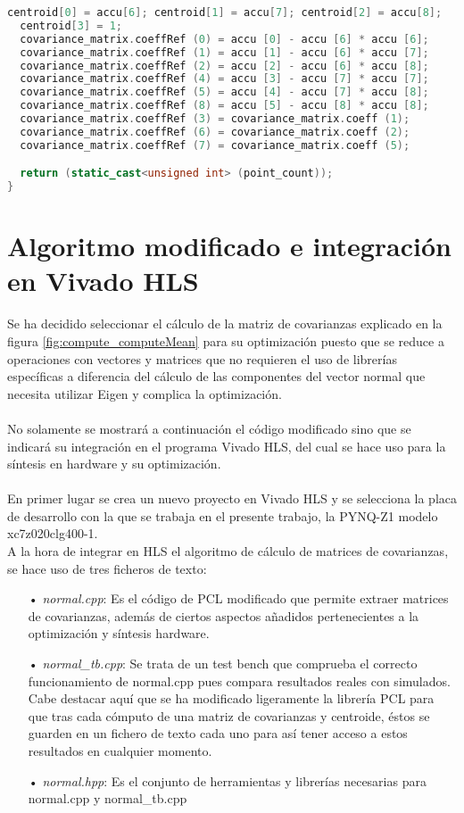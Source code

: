  \begin{lstlisting}[language=C++,breaklines]
  centroid[0] = accu[6]; centroid[1] = accu[7]; centroid[2] = accu[8];
  centroid[3] = 1;
  covariance_matrix.coeffRef (0) = accu [0] - accu [6] * accu [6];
  covariance_matrix.coeffRef (1) = accu [1] - accu [6] * accu [7];
  covariance_matrix.coeffRef (2) = accu [2] - accu [6] * accu [8];
  covariance_matrix.coeffRef (4) = accu [3] - accu [7] * accu [7];
  covariance_matrix.coeffRef (5) = accu [4] - accu [7] * accu [8];
  covariance_matrix.coeffRef (8) = accu [5] - accu [8] * accu [8];
  covariance_matrix.coeffRef (3) = covariance_matrix.coeff (1);
  covariance_matrix.coeffRef (6) = covariance_matrix.coeff (2);
  covariance_matrix.coeffRef (7) = covariance_matrix.coeff (5);

  return (static_cast<unsigned int> (point_count));
}
\end{lstlisting}



\section{Algoritmo modificado e integración en Vivado HLS}
Se ha decidido seleccionar el cálculo de la matriz de covarianzas explicado en la figura \ref{fig:compute_computeMean} para su optimización puesto que se reduce a operaciones con vectores y matrices que no requieren el uso de librerías específicas a diferencia del cálculo de las componentes del vector normal que necesita utilizar Eigen y complica la optimización.
\\
\\
No solamente se mostrará a continuación el código modificado sino que se indicará su integración en el programa Vivado HLS, del cual se hace uso para la síntesis en hardware y su optimización.
\\
\\
En primer lugar se crea un nuevo proyecto en Vivado HLS y se selecciona la placa de desarrollo con la que se trabaja en el presente trabajo, la PYNQ-Z1 modelo xc7z020clg400-1.
\\
A la hora de integrar en HLS el algoritmo de cálculo de matrices de covarianzas, se hace uso de tres ficheros de texto:

\begin{itemize}
\item[•] \textit{normal.cpp}: Es el código de PCL modificado que permite extraer matrices de covarianzas, además de ciertos aspectos añadidos pertenecientes a la optimización y síntesis hardware.
\item[•] \textit{normal\_tb.cpp}: Se trata de un test bench que comprueba el correcto funcionamiento de normal.cpp pues compara resultados reales con simulados. Cabe destacar aquí que se ha modificado ligeramente la librería PCL para que tras cada cómputo de una matriz de covarianzas y centroide, éstos se guarden en un fichero de texto cada uno para así tener acceso a estos resultados en cualquier momento.
\item[•] \textit{normal.hpp}: Es el conjunto de herramientas y librerías necesarias para normal.cpp y normal\_tb.cpp
\end{itemize}

